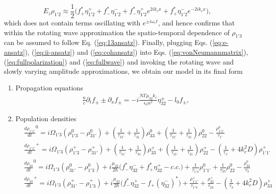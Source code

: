 \documentclass[twocolumn,secnumarabic,amssymb, nobibnotes, aps, prd]{revtex4-1}
\begin{document}
$$
E_z\rho_{1'2} \approx  \frac{1}{2}\big (f_{+}^*\eta_{1'2}^{+}+f_{-}^*\eta_{1'2}^{-} + f_{-}^* \eta_{1'2}^{+}e^{2ik_c x} +f_{+}^* \eta_{1'2}^{-}e^{-2ik_c x}  \big ),
$$
which does not contain terms oscillating with $e^{\pm i\omega_ct }$, and hence confirms that within the rotating wave approximation the spatio-temporal dependence of $\rho_{1'3}$ can be assumed to follow Eq. (\ref{eq:13ansatz}).
Finally, plugging Eqs. (\ref{eq:e-ansatz}), (\ref{eq:ii-ansatz}) and (\ref{eq:cohansatz}) into Eqs. (\ref{eq:vonNeumannmatrix}), (\ref{eq:fullpolarization}) and (\ref{eq:fullwave})  and invoking the rotating wave and slowly varying amplitude approximations, we obtain our model in its final form
\begin{enumerate}
	\item { Propagation equations
		\begin{align}
		&\frac{n}{c}\partial_t f_{\pm} \pm \partial_{x}f_{\pm} = -i\frac{N \Gamma \mu_{32} k_c}{\epsilon_0 n^2} \eta_{32}^{\pm} - l_0 f_{\pm} \label{eq:rtwave},
		\end{align} }
	\item{ Population densities
		\begin{subequations}
			\label{eq:diagonaldm}
			\begin{align}
			&\frac{d \rho_{1'1'}}{d t}^{0} = i\Omega_{1'3} (\rho_{1'3}^{0} - \rho_{31'}^{0}) + (\frac{1}{\tau_{31'}} + \frac{1}{\tau_{31}})\rho_{33}^{0} 
			+ (\frac{1}{\tau_{21'}} + \frac{1}{\tau_{21}})\rho_{22}^{0} - \frac{\rho_{1'1'}^{0}}{\tau_{1'}} \label{eq:rho11-dm} \\
			&\frac{d \rho_{1'1'}}{d t}^{+} = i\Omega_{1'3} (\rho_{1'3}^{+} - \rho_{31'}^{+}) + (\frac{1}{\tau_{31'}} + \frac{1}{\tau_{31}})\rho_{33}^{+}  
			+ (\frac{1}{\tau_{21'}} + \frac{1}{\tau_{21}})\rho_{22}^{+} - (\frac{1}{\tau_{1'}} + 4k_c^2D )\rho_{1'1'}^{+}  \label{eq:rtpop1grating}\\
			&\frac{d \rho_{33}}{d t}^0 = i\Omega_{1'3} (\rho_{31'}^0 - \rho_{1'3}^0) + i\frac{\mu_{32}}{2\hbar} \big (f_{-}^*\eta_{32}^{-}+f_{+}^*\eta_{32}^{+} - c.c. \big )+ \frac{1}{\tau_{1'3}}\rho_{1'1'}^0 +  \frac{1}{\tau_{23}}\rho_{22}^0 - \frac{\rho_{33}^0}{\tau_{3}}  \\
			&\frac{d \rho_{33}}{d t}^{+}   = i\Omega_{1'3} (\rho_{31'}^{+} - \rho_{1'3}^{+}) + i\frac{\mu_{32}}{2\hbar}\big ( f_{-}^*\eta_{32}^{+}-f_{+}(\eta_{32}^{-})^* \big ) 
			+ \frac{\rho_{1'1'}^+}{\tau_{1'3}} +  \frac{\rho_{22}^+}{\tau_{23}} - (\frac{1}{\tau_{3}} +4k_c^2D) \rho_{33}^+ \label{eq:rtpop3grating}\\

\end{align}
\end{subequations}}
\end{enumerate}
\end{document}
